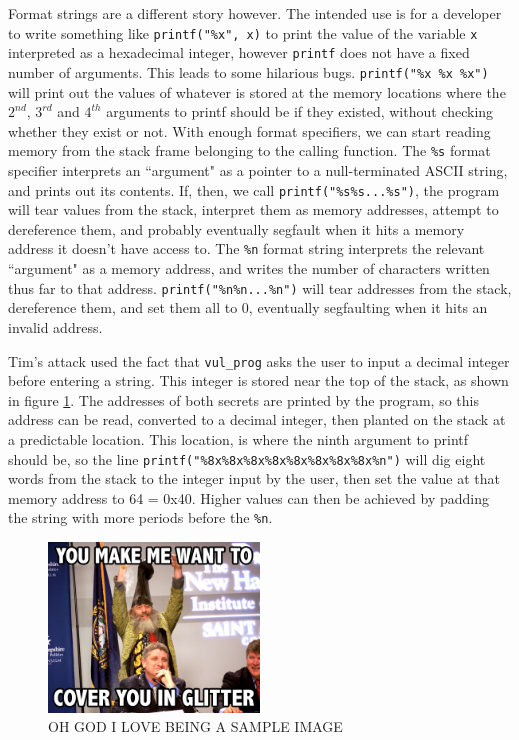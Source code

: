 Format strings are a different story however. The intended use is for a developer to write something like {\tt printf("\%x", x)} to print the value of the variable {\tt x} interpreted as a hexadecimal integer, however {\tt printf} does not have a fixed number of arguments. This leads to some hilarious bugs. {\tt printf("\%x \%x \%x")} will print out the values of whatever is stored at the memory locations where the $2^{nd}$, $3^{rd}$ and $4^{th}$ arguments to printf should be if they existed, without checking whether they exist or not. With enough format specifiers, we can start reading memory from the stack frame belonging to the calling function. The {\tt \%s} format specifier interprets an ``argument" as a pointer to a null-terminated ASCII string, and prints out its contents. If, then, we call {\tt printf("\%s\%s...\%s")}, the program will tear values from the stack, interpret them as memory addresses, attempt to dereference them, and probably eventually segfault when it hits a memory address it doesn't have access to. The {\tt \%n} format string interprets the relevant ``argument" as a memory address, and writes the number of characters written thus far to that address. {\tt printf("\%n\%n...\%n")} will tear addresses from the stack, dereference them, and set them all to 0, eventually segfaulting when it hits an invalid address.

Tim's attack used the fact that {\tt vul\_prog} asks the user to input a decimal integer before entering a string. This integer is stored near the top of the stack, as shown in figure \ref{fig_vul_prog_stack}. The addresses of both secrets are printed by the program, so this address can be read, converted to a decimal integer, then planted on the stack at a predictable location. This location, is where the ninth argument to printf should be, so the line {\tt printf("\%8x\%8x\%8x\%8x\%8x\%8x\%8x\%8x\%n")} will dig eight words from the stack to the integer input by the user, then set the value at that memory address to 64 = 0x40. Higher values can then be achieved by padding the string with more periods before the {\tt \%n}.


\begin{figure}[h]
\centering
\includegraphics[width = 0.5\textwidth]{./images/placeholder.jpg}
\caption{OH GOD I LOVE BEING A SAMPLE IMAGE}
\label{fig_vul_prog_stack}
\end{figure}



